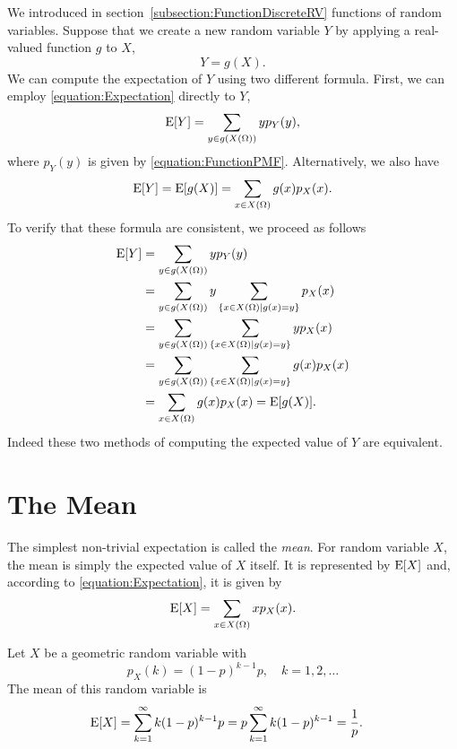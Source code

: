 We introduced in section~\ref{subsection:FunctionDiscreteRV} functions of random variables.
Suppose that we create a new random variable $Y$ by applying a real-valued function $g$ to $X$,
\begin{equation*}
Y = g(X) .
\end{equation*}
We can compute the expectation of $Y$ using two different formula.
First, we can employ \eqref{equation:Expectation} directly to $Y$,
\begin{equation*}
\mathrm{E} [Y] = \sum_{y \in g(X(\Omega))} y p_Y(y),
\end{equation*}
where $p_Y (y)$ is given by \eqref{equation:FunctionPMF}.
Alternatively, we also have
\begin{equation*}
\mathrm{E} [Y] = \mathrm{E} [g(X)] = \sum_{x \in X(\Omega)} g(x) p_X(x) .
\end{equation*}
To verify that these formula are consistent, we proceed as follows
\begin{equation*}
\begin{split}
\mathrm{E} [Y] &= \sum_{y \in g(X(\Omega))} y p_Y(y) \\
&= \sum_{y \in g(X(\Omega))} y
\sum_{\{x \in X(\Omega) | g(x) = y\}} p_X(x) \\
&= \sum_{y \in g(X(\Omega))}
\sum_{\{x \in X(\Omega) | g(x) = y\}} y p_X(x) \\
&= \sum_{y \in g(X(\Omega))}
\sum_{\{x \in X(\Omega) | g(x) = y\}} g(x) p_X(x) \\
&= \sum_{x \in X(\Omega)} g(x) p_X(x)
= \mathrm{E} [g(X)].
\end{split}
\end{equation*}
Indeed these two methods of computing the expected value of $Y$ are equivalent.


\section{The Mean}

The simplest non-trivial expectation is called the \emph{mean}.
For random variable $X$, the mean is simply the expected value of $X$ itself.
It is represented by $\mathrm{E} [X]$ and, according to \eqref{equation:Expectation}, it is given by
\begin{equation*}
\mathrm{E} [X] = \sum_{x \in X(\Omega)} x p_X (x) .
\end{equation*}

\begin{example}
Let $X$ be a geometric random variable with
\begin{equation*}
p_X (k) = (1-p)^{k-1} p, \quad k = 1, 2, \ldots
\end{equation*}
The mean of this random variable is
\begin{equation*}
\begin{split}
\mathrm{E} [X] &= \sum_{k=1}^{\infty} k (1-p)^{k-1} p
= p \sum_{k=1}^{\infty} k (1-p)^{k-1}
= \frac{1}{p} .
\end{split}
\end{equation*}
\end{example}

